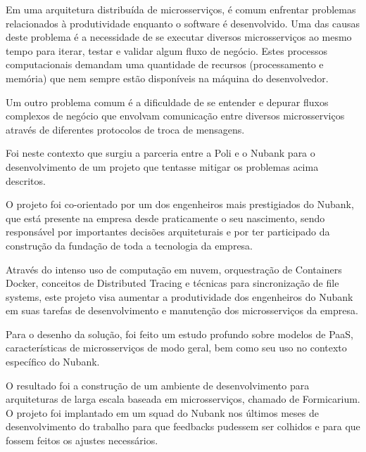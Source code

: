 \documentclass[]{politex}
\begin{document}
\begin{resumo}
	Em uma arquitetura distribuída de microsserviços, é comum enfrentar problemas relacionados à produtividade enquanto o software é desenvolvido. Uma das causas deste problema é a necessidade de se executar diversos microsserviços ao mesmo tempo para iterar, testar e validar algum fluxo de negócio. Estes processos computacionais demandam uma quantidade de recursos (processamento e memória) que nem sempre estão disponíveis na máquina do desenvolvedor.
	
	Um outro problema comum é a dificuldade de se entender e depurar fluxos complexos de negócio que envolvam comunicação entre diversos microsserviços através de diferentes protocolos de troca de mensagens.
	
	Foi neste contexto que surgiu a parceria entre a Poli e o Nubank para o desenvolvimento de um projeto que tentasse mitigar os problemas acima descritos.
	
	
	O projeto foi co-orientado por um dos engenheiros mais prestigiados do Nubank, que está presente na empresa desde praticamente o seu nascimento, sendo responsável por importantes decisões arquiteturais e por ter participado da construção da fundação de toda a tecnologia da empresa.
	
	Através do intenso uso de computação em nuvem, orquestração de Containers Docker, conceitos de Distributed Tracing e técnicas para sincronização de file systems, este projeto visa aumentar a produtividade dos engenheiros do Nubank em suas tarefas de desenvolvimento e manutenção dos microsserviços da empresa.
	
	Para o desenho da solução, foi feito um estudo profundo sobre modelos de PaaS, características de microsserviços de modo geral, bem como seu uso no contexto específico do Nubank. 
	
	O resultado foi a construção de um ambiente de desenvolvimento para arquiteturas de larga escala baseada em microsserviços, chamado de Formicarium. O projeto foi implantado em um squad do Nubank nos últimos meses de desenvolvimento do trabalho para que feedbacks pudessem ser colhidos e para que fossem feitos os ajustes necessários.
	

\end{resumo}
\end{document}
